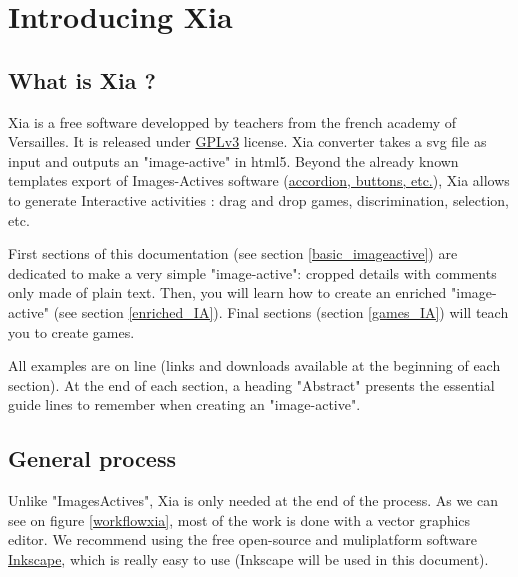 


 \maketitle
 \tableofcontents
  
\section{Introducing Xia}

\subsection{What is Xia ?}

Xia is a free software developped by teachers from the french academy of Versailles.
It is released under \href{http://www.gnu.org/copyleft/gpl.html}{GPLv3} license.
Xia converter takes a svg file as input and outputs an "image-active" in 
html5. Beyond the already known templates export of Images-Actives software
(\href{http://images-actives.crdp-versailles.fr/spip.php?article11\&lang=fr}
{accordion, buttons, etc.}), Xia allows to generate
Interactive activities : drag and drop games, discrimination, selection, etc.

First sections of this documentation (see section \ref{basic_imageactive}) are dedicated to make a very simple 
"image-active": cropped details with comments only made of plain text.
Then, you will learn how to create an enriched "image-active" (see section \ref{enriched_IA}).
Final sections (section \ref{games_IA}) will teach you to create games.
\begin{astuce}
All examples are on line (links and downloads available at 
the beginning of each section). At the end
of each section, a heading "Abstract" presents the essential guide lines to 
remember when creating an "image-active". 
\end{astuce}

\subsection{General process}

Unlike "ImagesActives", Xia is only needed at the end of the process.
As we can see on figure \ref{workflowxia}, most of the work is done with 
a  vector graphics editor. We recommend using the free open-source and 
muliplatform software \href{http://www.inkscape.org/}{Inkscape}, which is 
really easy to use (Inkscape will be used in this document).

